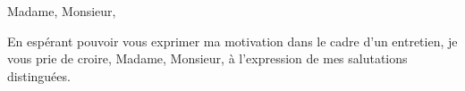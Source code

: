 \documentclass[12pt,a4paper,sans]{moderncv}
\begin{document}

\date{Le 21 Octobre 2016}
\opening{Madame, Monsieur,}
\closing{En esp\'erant pouvoir vous exprimer ma motivation dans le cadre d'un entretien, je vous prie de croire, Madame, Monsieur, \`a l'expression de mes salutations distingu\'ees.}


\newif \ifmedical

\makelettertitle
\end{document}
